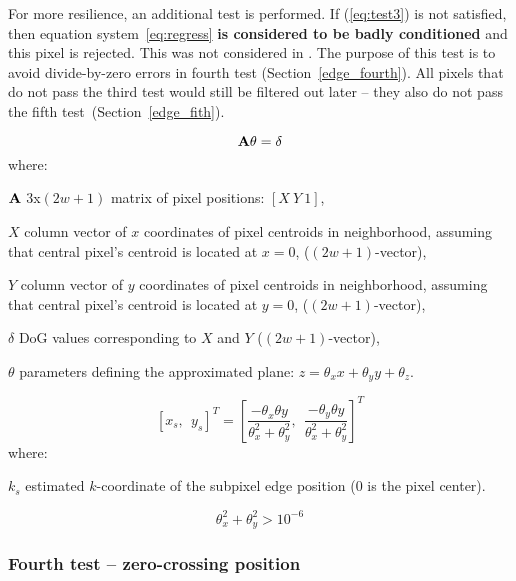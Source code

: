For more resilience, an additional test is performed. If (\ref{eq:test3}) is not satisfied, then equation system~\ref{eq:regress} \textbf{is considered to be badly conditioned} and this pixel is rejected. This was not considered in \cite{jose2015realtime}. The purpose of this test is to avoid divide-by-zero errors in fourth test (Section~\ref{edge_fourth}). All pixels that do not pass the third test would still be filtered out later -- they also do not pass the fifth test~(Section~\ref{edge_fith}).

\begin{equation}
\textbf{A}\theta = \delta
\label{eq:regress}
\end{equation}
where:
\begin{eqwhere}[2cm]
	\item[$\textbf{A}$] 3x$(2w+1)$ matrix of pixel positions: $[X\ Y\ 1]$,
	\item[$X$] column vector of $x$ coordinates of pixel centroids in neighborhood, assuming that central pixel's centroid is located at $x = 0$, ($(2w+1)$-vector),
	\item[$Y$] column vector of $y$ coordinates of pixel centroids in neighborhood, assuming that central pixel's centroid is located at $y = 0$, ($(2w+1)$-vector),
	\item[$\delta$] DoG values corresponding to $X$ and $Y$ ($(2w+1)$-vector),
	\item[$\theta$] parameters defining the approximated plane: $z = \theta_{x}x + \theta_{y}y + \theta_{z}$.
\end{eqwhere}



\begin{equation}
\left[ x_s,\ \ y_s \right]^T = \left[ \frac{-\theta_{x} \theta{y}}{\theta_x^2 + \theta_y^2},\ \ \frac{-\theta_{y} \theta{y}}{\theta_x^2 + \theta_y^2} \right]^T
\label{eq:zerocross}
\end{equation}
where:
\begin{eqwhere}[2cm]
	\item[$k_s$] estimated $k$-coordinate of the subpixel edge position (0 is the pixel center).
\end{eqwhere}

\begin{equation}
\theta_{x}^2 + \theta_{y}^2 > 10^{-6}
\label{eq:test3}
\end{equation}

\subsubsection*{Fourth test -- zero-crossing position}
\label{edge_fourth}

